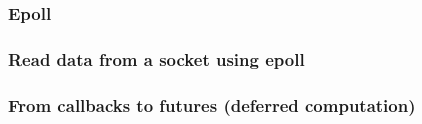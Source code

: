% 
% 
% 
% 
\begin{frame}[fragile]
    \frametitle{Epoll}
\end{frame}
% 
% 
% 
\begin{frame}[fragile]
    \frametitle{Read data from a socket using epoll}
\end{frame}
% 
% 
% 
% 
% 
% 
\begin{frame}[fragile]
    \frametitle{From callbacks to futures (deferred computation)}
\end{frame}
